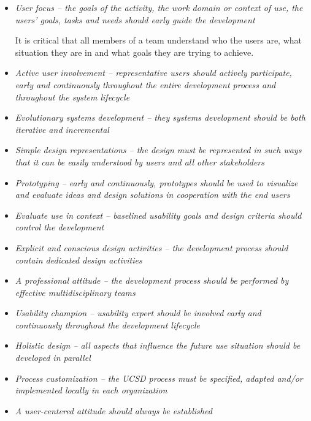 \begin{itemize}
  \item{%
      \textit{%
        User focus -- the goals of the activity, the work domain or
        context of use, the users' goals, tasks and  needs should early guide
        the development%
      }\cite{citeKeyPrinciplesUserCentric}

      It is critical that all members of a team understand who the users are,
      what situation they are in and what goals they are trying to achieve.
  }
  \item{%
      \textit{%
        Active user involvement -- representative users should actively
        participate, early and continuously throughout the entire development
        process and throughout the system lifecycle%
      }\cite{citeKeyPrinciplesUserCentric}
  }
  \item{%
      \textit{%
        Evolutionary systems development -- they systems development should be
        both iterative and incremental%
      }\cite{citeKeyPrinciplesUserCentric}
  }
  \item{%
      \textit{%
        Simple design representations -- the design must be represented in
        such ways that it can be easily understood by users and all other
        stakeholders%
      }\cite{citeKeyPrinciplesUserCentric}
  }
  \item{%
      \textit{%
        Prototyping -- early and continuously, prototypes should be used to
        visualize and evaluate ideas and design solutions in cooperation with
        the end users%
      }\cite{citeKeyPrinciplesUserCentric}
  }
  \item{%
      \textit{%
        Evaluate use in context -- baselined usability goals and design
        criteria should control the development%
      }\cite{citeKeyPrinciplesUserCentric}
  }
  \item{%
      \textit{%
        Explicit and conscious design activities -- the development process
        should contain dedicated design activities%
      }\cite{citeKeyPrinciplesUserCentric}
  }
  \item{%
      \textit{%
        A professional attitude -- the development process should be performed
        by effective multidisciplinary teams%
      }\cite{citeKeyPrinciplesUserCentric}
  }
  \item{%
      \textit{%
        Usability champion -- usability expert should be involved early and
        continuously throughout the development lifecycle%
      }\cite{citeKeyPrinciplesUserCentric}
  }
  \item{%
      \textit{%
        Holistic design -- all aspects that influence the future use situation
        should be developed in parallel%
      }\cite{citeKeyPrinciplesUserCentric}
  }
  \item{%
      \textit{%
        Process customization -- the UCSD process must be specified, adapted
        and/or implemented locally in each organization%
      }\cite{citeKeyPrinciplesUserCentric}
  }
  \item{%
      \textit{%
        A user-centered attitude should always be established%
      }\cite{citeKeyPrinciplesUserCentric}
  }
\end{itemize}
